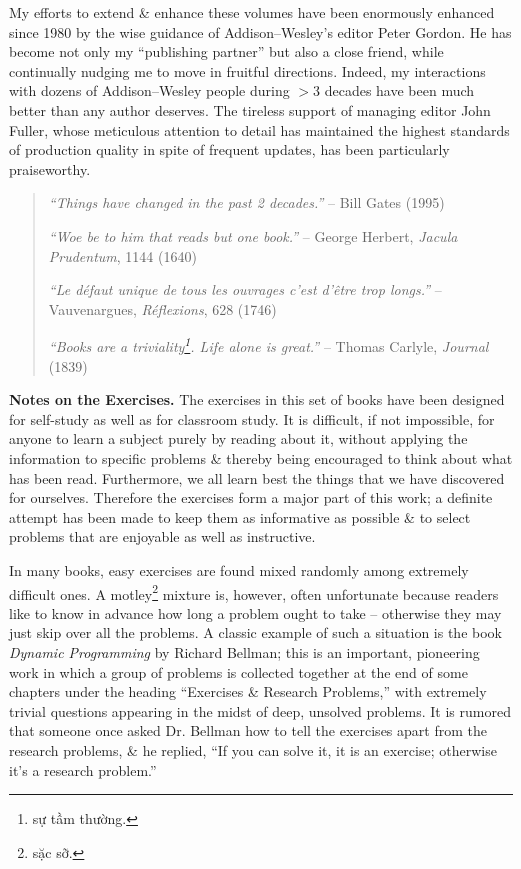 \documentclass{article}
\begin{document}
My efforts to extend \& enhance these volumes have been enormously enhanced since 1980 by the wise guidance of Addison--Wesley's editor {\sc Peter Gordon}. He has become not only my ``publishing partner'' but also a close friend, while continually nudging me to move in fruitful directions. Indeed, my interactions with dozens of Addison--Wesley people during $> 3$ decades have been much better than any author deserves. The tireless support of managing editor {\sc John Fuller}, whose meticulous attention to detail has maintained the highest standards of production quality in spite of frequent updates, has been particularly praiseworthy.
\begin{quote}
	{\it``Things have changed in the past 2 decades.''} -- {\sc Bill Gates} (1995)
	
	{\it``Woe be to him that reads but one book.''} -- {\sc George Herbert}, {\it Jacula Prudentum}, 1144 (1640)
	
	{\it``Le défaut unique de tous les ouvrages c'est d'être trop longs.''} -- {\sc Vauvenargues}, {\it R\'eflexions}, 628 (1746)
	
	{\it``Books are a triviality\footnote{sự tầm thường.}. Life alone is great.''} -- {\sc Thomas Carlyle}, {\it Journal} (1839)
\end{quote}
{\bf Notes on the Exercises.} The exercises in this set of books have been designed for self-study as well as for classroom study. It is difficult, if not impossible, for anyone to learn a subject purely by reading about it, without applying the information to specific problems \& thereby being encouraged to think about what has been read. Furthermore, we all learn best the things that we have discovered for ourselves. Therefore the exercises form a major part of this work; a definite attempt has been made to keep them as informative as possible \& to select problems that are enjoyable as well as instructive.

In many books, easy exercises are found mixed randomly among extremely difficult ones. A motley\footnote{sặc sỡ.} mixture is, however, often unfortunate because readers like to know in advance how long a problem ought to take -- otherwise they may just skip over all the problems. A classic example of such a situation is the book {\it Dynamic Programming} by {\sc Richard Bellman}; this is an important, pioneering work in which a group of problems is collected together at the end of some chapters under the heading ``Exercises \& Research Problems,'' with extremely trivial questions appearing in the midst of deep, unsolved problems. It is rumored that someone once asked Dr. {\sc Bellman} how to tell the exercises apart from the research problems, \& he replied, ``If you can solve it, it is an
exercise; otherwise it's a research problem.''
\end{document}
